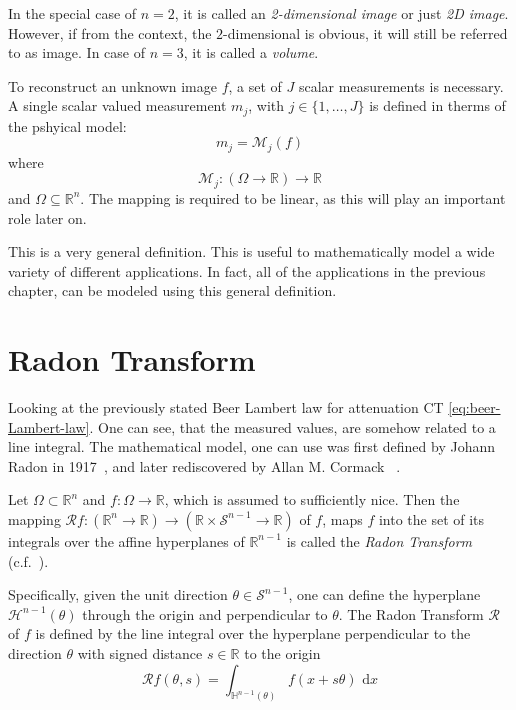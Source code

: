 
In the special case of \(n=2\), it is called an \textit{2-dimensional image} or just
\textit{2D image}. However, if from the context, the \(2\)-dimensional is obvious, it will still be
referred to as image. In case of \(n=3\), it is called a \textit{volume}.

\begin{definition}\label{def:forward-model}
	To reconstruct an unknown image \(f\), a set of \(J\) scalar measurements is necessary.
	A single scalar valued measurement \(m_j\), with \(j \in \{1, \dots, J\}\) is defined in therms
	of the pshyical model:
	\[ m_j = \mathscr{M}_j(f)\]
	where
	\[ \mathscr{M}_j\colon (\Omega \to \mathbb{R}) \to \mathbb{R} \]
	and \(\Omega \subseteq \mathbb{R}^n\). The mapping is required to be linear, as this will play an
	important role later on.
\end{definition}

This is a very general definition. This is useful to mathematically model a wide variety of
different applications. In fact, all of the applications in the previous chapter, can be modeled
using this general definition.

\section{Radon Transform}\label{sec:radon_transform}

Looking at the previously stated Beer Lambert law for attenuation CT \autoref{eq:beer-Lambert-law}.
One can see, that the measured values, are somehow related to a line integral. The mathematical
model, one can use was first defined by Johann Radon in
1917~\cite{radon_uber_1917,radon_determination_1986}, and later rediscovered by Allan M. Cormack
~\cite{cormack_representation_1963}.

\begin{definition}
	Let \(\Omega \subset \mathbb{R}^n\) and \(f\colon \Omega \to \mathbb{R}\), which is assumed
	to sufficiently nice. Then the mapping \(\mathscr{R}f\colon (\mathbb{R}^n \to \mathbb{R})
	\to (\mathbb{R} \times \mathscr{S}^{n-1} \to \mathbb{R})\) of \(f\), maps \(f\) into the set
	of its integrals over the affine hyperplanes of \(\mathbb{R}^{n-1}\) is called the
	\textit{Radon Transform} (c.f.~\cite{natterer_mathematics_1986,buzug_computed_2008}).

	Specifically, given the unit direction \(\theta \in \mathscr{S}^{n-1}\), one can define the
	hyperplane \(\mathscr{H}^{n-1}(\theta)\) through the origin and perpendicular to \(\theta\).
	The Radon Transform \(\mathscr{R}\) of \(f\) is defined by the line integral over the
	hyperplane perpendicular to the direction \(\theta\) with signed distance \(s \in
	\mathbb{R}\) to the origin
	\[ \mathscr{R}f(\theta, s) = \int_{\mathbb{H}^{n-1}(\theta)} f(x + s\theta) \, \, \mathrm{d}x \]
\end{definition}

